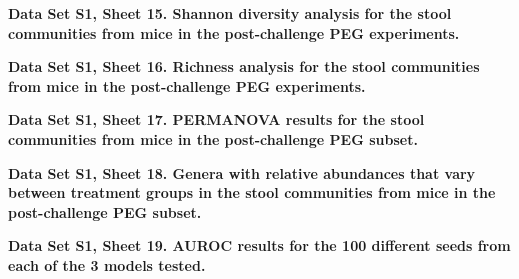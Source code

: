 \documentclass[
  11pt,
]{article}
\begin{document}
\textbf{Data Set S1, Sheet 15. Shannon diversity analysis for the stool
communities from mice in the post-challenge PEG experiments.}

\textbf{Data Set S1, Sheet 16. Richness analysis for the stool
communities from mice in the post-challenge PEG experiments.}

\textbf{Data Set S1, Sheet 17. PERMANOVA results for the stool
communities from mice in the post-challenge PEG subset.}

\textbf{Data Set S1, Sheet 18. Genera with relative abundances that vary
between treatment groups in the stool communities from mice in the
post-challenge PEG subset.}

\textbf{Data Set S1, Sheet 19. AUROC results for the 100 different seeds
from each of the 3 models tested.}
\end{document}
